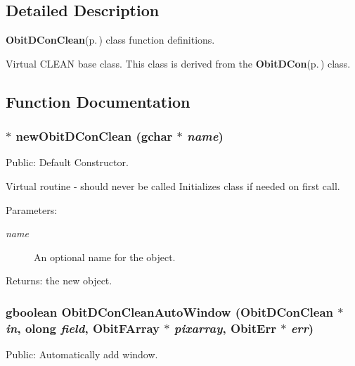 \subsection{Detailed Description}
{\bf Obit\-DCon\-Clean}{\rm (p.\,\pageref{structObitDConClean})} class function definitions. 

Virtual CLEAN base class. This class is derived from the {\bf Obit\-DCon}{\rm (p.\,\pageref{structObitDCon})} class.

\subsection{Function Documentation}
\subsubsection{$\ast$ new\-Obit\-DCon\-Clean (gchar $\ast$ {\em name})}\label{ObitDConClean_8c_a12}


Public: Default Constructor. 

Virtual routine - should never be called Initializes class if needed on first call. \begin{Desc}
\item[Parameters:]
\begin{description}
\item[{\em name}]An optional name for the object. \end{description}
\end{Desc}
\begin{Desc}
\item[Returns:]the new object. \end{Desc}
\subsubsection{\setlength{\rightskip}{0pt plus 5cm}gboolean Obit\-DCon\-Clean\-Auto\-Window ({\bf Obit\-DCon\-Clean} $\ast$ {\em in}, {\bf olong} {\em field}, {\bf Obit\-FArray} $\ast$ {\em pixarray}, {\bf Obit\-Err} $\ast$ {\em err})}\label{ObitDConClean_8c_a27}


Public: Automatically add window. 

